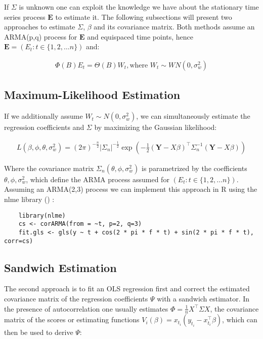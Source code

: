 If $\Sigma$ is unknown one can exploit the knowledge we have about the stationary time series process $\mathbf{E}$ to estimate it.
The following subsections will present two approaches to estimate $\Sigma$, $\beta $ and its covariance matrix.
Both methods assume an ARMA(p,q) process for $\mathbf{E}$ and equispaced time points,
hence $\mathbf{E} = (E_t: t \in \{1, 2, \dots  n \})$ and:

\begin{gather*}
    \Phi(B)E_t = \Theta(B)W_t, \text{where $W_t \sim WN(0, \sigma_w^2)$}
\end{gather*}


\subsection{Maximum-Likelihood Estimation}\label{subsec:maximum-likelihood-estimation}

If we additionally assume $W_t \sim N(0, \sigma_w^2)$, we can simultaneously estimate the regression coefficients and $\Sigma$ by
maximizing the Gaussian likelihood:

\begin{gather*}
    L(\beta, \phi, \theta, \sigma_w^2) = (2 \pi)^{-\frac{n}{2}} |\Sigma_n|^{-\frac{1}{2}} \exp(-\frac{1}{2}
    (\mathbf{Y}-X\beta)^{\top} \Sigma_n^{-1}(\mathbf{Y}-X\beta))
\end{gather*}

Where the covariance matrix $\Sigma_n(\theta, \phi, \sigma_w^2)$ is parametrized by the coefficients $\theta, \phi, \sigma_w^2$, which
define the ARMA process assumed for $(E_t: t \in \{1, 2, \dots  n \})$.
Assuming an ARMA(2,3) process we can implement this approach in R using the nlme library (\citeauthor{box_time_1994})
:
\begin{verbatim}
    library(nlme)
    cs <- corARMA(from = ~t, p=2, q=3)
    fit.gls <- gls(y ~ t + cos(2 * pi * f * t) + sin(2 * pi * f * t), corr=cs)
\end{verbatim}


\subsection{Sandwich Estimation}
The second approach is to fit an OLS regression first and correct the estimated covariance matrix of the regression coefficients $\Psi$ with a
sandwich estimator.
In the presence of autocorrelation one usually estimates $\Phi = \frac{1}{n} X^{\top} \Sigma X$,
the covariance matrix of the scores or estimating functions
$V_i(\beta) = x_{t_i}(y_{t_i} - x_{t_i}^{\top}\beta)$, which can then be used to derive $\Psi$:

